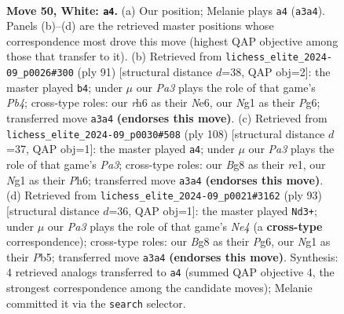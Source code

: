 \documentclass[11pt]{article}
\begin{document}
\clearpage

\begin{figure}[p]\centering
\begin{subfigure}{0.46\textwidth}\centering
\resizebox{\linewidth}{!}{%
\newchessgame
\chessboard[
  setfen={2k3B1/8/7r/B7/5pbp/PP6/1K6/R5N1 w - - 2 50},
  showmover=false,
  pgfstyle=straightmove, color=movearrow, markmove={a3-a4}
]}
\caption{}
\end{subfigure}\hfill
\begin{subfigure}{0.46\textwidth}\centering
\resizebox{\linewidth}{!}{%
\newchessgame
\chessboard[
  setfen={8/1r3k1p/4n1pB/1p6/6PP/8/R5K1/8 b - - 1 46},
  showmover=false,
  pgfstyle=straightmove, color=movearrow, markmove={b5-b4}
]}
\caption{}
\end{subfigure}
\\[4pt]
\begin{subfigure}{0.46\textwidth}\centering
\resizebox{\linewidth}{!}{%
\newchessgame
\chessboard[
  setfen={8/2B4p/7P/2R5/4b3/PKP2k2/8/4r3 w - - 3 55},
  showmover=false,
  pgfstyle=straightmove, color=movearrow, markmove={a3-a4}
]}
\caption{}
\end{subfigure}\hfill
\begin{subfigure}{0.46\textwidth}\centering
\resizebox{\linewidth}{!}{%
\newchessgame
\chessboard[
  setfen={8/4r3/5kp1/1p2n3/1P6/pBP4R/8/1bN1K3 b - - 6 47},
  showmover=false,
  pgfstyle=straightmove, color=movearrow, markmove={e5-d3}
]}
\caption{}
\end{subfigure}
\caption{\textbf{Move 50, White: \texttt{a4}.} (a) Our position; Melanie plays \texttt{a4} (\texttt{a3a4}). Panels (b)--(d) are the retrieved master positions whose correspondence most drove this move (highest QAP objective among those that transfer to it). (b) Retrieved from \texttt{lichess\_elite\_2024-09\_p0026\#300} (ply 91) [structural distance $d$=38, QAP obj=2]: the master played \texttt{b4}; under $\mu$ our \emph{Pa3} plays the role of that game's \emph{Pb4}; cross-type roles: our \emph{r}h6 as their \emph{N}e6, our \emph{N}g1 as their \emph{P}g6; transferred move \texttt{a3a4} \textbf{(endorses this move)}. (c) Retrieved from \texttt{lichess\_elite\_2024-09\_p0030\#508} (ply 108) [structural distance $d$=37, QAP obj=1]: the master played \texttt{a4}; under $\mu$ our \emph{Pa3} plays the role of that game's \emph{Pa3}; cross-type roles: our \emph{B}g8 as their \emph{r}e1, our \emph{N}g1 as their \emph{P}h6; transferred move \texttt{a3a4} \textbf{(endorses this move)}. (d) Retrieved from \texttt{lichess\_elite\_2024-09\_p0021\#3162} (ply 93) [structural distance $d$=36, QAP obj=1]: the master played \texttt{Nd3+}; under $\mu$ our \emph{Pa3} plays the role of that game's \emph{Ne4} (a \textbf{cross-type} correspondence); cross-type roles: our \emph{B}g8 as their \emph{P}g6, our \emph{N}g1 as their \emph{P}b5; transferred move \texttt{a3a4} \textbf{(endorses this move)}. Synthesis: 4 retrieved analogs transferred to \texttt{a4} (summed QAP objective 4, the strongest correspondence among the candidate moves); Melanie committed it via the \texttt{search} selector.}
\label{fig:thought-m98}
\end{figure}
\end{document}
